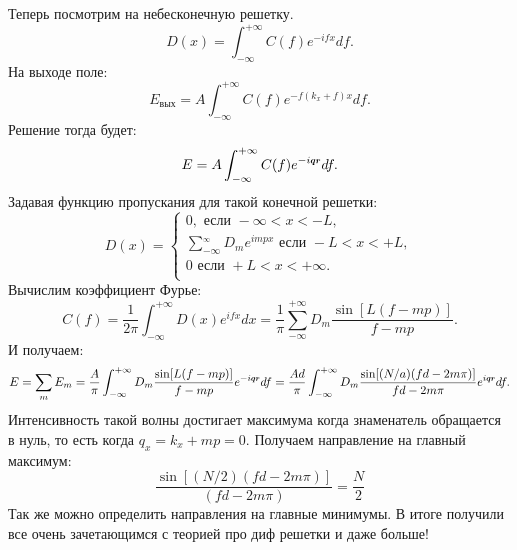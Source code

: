 Теперь посмотрим на небесконечную решетку.
\begin{equation*}
	D(x) = \int_{-\infty}^{+\infty} C(f) e^{-i f x} d f.
\end{equation*}
На выходе поле:
\begin{equation*}
	E_\text{вых} = A \int_{-\infty}^{+\infty} C(f) e^{-f(k_x +f)x}d f.
\end{equation*}
Решение тогда будет:
\begin{equation*}
	E = A \int_{-\infty}^{+\infty} C(f) e^{- i \smallvc{q} \smallvc{r}} d f.
\end{equation*}
Задавая функцию пропускания для такой конечной решетки:
\begin{equation*}
	D(x) =\left\{
	\begin{aligned}
		0, \text{ если } -\infty < x < - L,\\
		\sum_{-\infty}^{_\infty} D_m e^{i m p x}\text{ если } - L < x < + L,\\
		0\text{ если } + L < x < +\infty.\\
	\end{aligned}
	\right.
\end{equation*}
Вычислим коэффициент Фурье:
\begin{equation*}
	C(f) = \frac{1}{2 \pi} \int_{- \infty}^{+\infty} D(x) e^{i f x} dx = \frac{1}{\pi} \sum_{-\infty}^{+\infty} D_m \frac{\sin[L (f - mp)]}{f - mp}.
\end{equation*}
И получаем:
\begin{equation*}
	E = \sum_m E_m = \frac{A}{\pi} \int_{-\infty}^{+\infty} D_m \frac{\sin[L(f-mp)]}{f - mp}e^{-i \smallvc{q} \smallvc{r}} d f = \frac{A d}{\pi} \int_{-\infty}^{+\infty} D_m \frac{\sin[(N/a)(f d - 2 m \pi)]}{f d - 2m \pi}e^{i \smallvc{q} \smallvc{r}} d f.
\end{equation*}
Интенсивность такой волны достигает максимума когда знаменатель обращается в нуль, то есть когда $q_x = k_x + mp = 0$. Получаем направление на главный максимум:
\begin{equation*}
	\frac{\sin [(N/2)(fd - 2 m\pi)]}{(f d - 2 m \pi)} = \frac{N}{2}
\end{equation*}
Так же можно определить направления на главные минимумы. В итоге получили все очень зачетающимся с теорией про диф решетки и даже больше!

